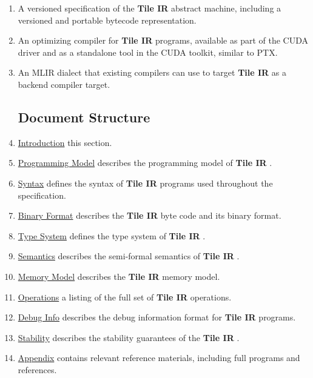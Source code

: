\documentclass{article}
\begin{document}
\begin{enumerate}
\item A versioned specification of the \textbf{Tile IR} abstract machine, including a versioned and portable bytecode representation.
\item An optimizing compiler for \textbf{Tile IR} programs, available as part of the CUDA driver and as a standalone tool in the CUDA toolkit, similar to PTX.
\item An MLIR dialect that existing compilers can use to target \textbf{Tile IR} as a backend compiler target.


\subsection{Document Structure}

\item \href{https://docs.nvidia.com/cuda/tile-ir/latest/sections/introduction.html#section-introduction}{Introduction} this section.
\item \href{https://docs.nvidia.com/cuda/tile-ir/latest/sections/prog_model.html#section-prog-model}{Programming Model} describes the programming model of \textbf{Tile IR} .
\item \href{https://docs.nvidia.com/cuda/tile-ir/latest/sections/syntax.html#section-syntax}{Syntax} defines the syntax of \textbf{Tile IR} programs used throughout the specification.
\item \href{https://docs.nvidia.com/cuda/tile-ir/latest/sections/bytecode.html#section-bytecode}{Binary Format} describes the \textbf{Tile IR} byte code and its binary format.
\item \href{https://docs.nvidia.com/cuda/tile-ir/latest/sections/types.html#section-types}{Type System} defines the type system of \textbf{Tile IR} .
\item \href{https://docs.nvidia.com/cuda/tile-ir/latest/sections/semantics.html#section-semantics}{Semantics} describes the semi-formal semantics of \textbf{Tile IR} .
\item \href{https://docs.nvidia.com/cuda/tile-ir/latest/sections/memory_model.html#section-memory-model}{Memory Model} describes the \textbf{Tile IR} memory model.
\item \href{https://docs.nvidia.com/cuda/tile-ir/latest/sections/operations.html#section-operations}{Operations} a listing of the full set of \textbf{Tile IR} operations.
\item \href{https://docs.nvidia.com/cuda/tile-ir/latest/sections/debug_info.html#section-debug-info}{Debug Info} describes the debug information format for \textbf{Tile IR} programs.
\item \href{https://docs.nvidia.com/cuda/tile-ir/latest/sections/stability.html#section-stability}{Stability} describes the stability guarantees of the \textbf{Tile IR} .
\item \href{https://docs.nvidia.com/cuda/tile-ir/latest/sections/appendix.html#section-appendix}{Appendix} contains relevant reference materials, including full programs and references.
\end{enumerate}
\end{document}
